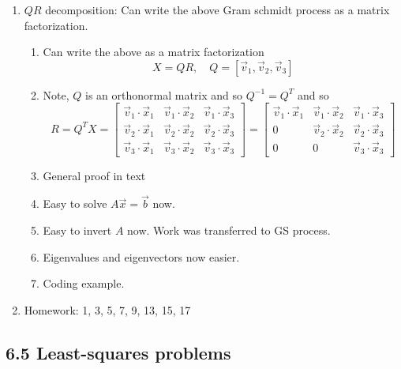 \documentclass{article}
\begin{document}
\begin{enumerate}
\item $QR$ decomposition: Can write the above Gram schmidt process as a matrix factorization.
\begin{enumerate}
\item Can write the above as a matrix factorization
\[
X = Q R, \quad Q = \left[ \vec{v}_1, \vec{v}_2, \vec{v}_3 \right]
\]
\item Note, $Q$ is an orthonormal matrix and so $Q^{-1} = Q^T$ and so
\[
R = Q^T X = \left[
\begin{array}{ccc}
\vec{v}_1 \cdot \vec{x}_1  & \vec{v}_1 \cdot \vec{x}_2  & \vec{v}_1 \cdot \vec{x}_3 \\
\vec{v}_2 \cdot \vec{x}_1  & \vec{v}_2 \cdot \vec{x}_2  & \vec{v}_2 \cdot \vec{x}_3 \\
\vec{v}_3 \cdot \vec{x}_1  & \vec{v}_3 \cdot \vec{x}_2  & \vec{v}_3 \cdot \vec{x}_3  
\end{array}
\right] = 
 \left[
\begin{array}{ccc}
\vec{v}_1 \cdot \vec{x}_1 & \vec{v}_1 \cdot \vec{x}_2  & \vec{v}_1 \cdot \vec{x}_3 \\
0 & \vec{v}_2 \cdot \vec{x}_2  & \vec{v}_2 \cdot \vec{x}_3 \\
0 & 0  & \vec{v}_3 \cdot \vec{x}_3
\end{array}
\right]
\]
\item General proof in text
\item Easy to solve $A \vec{x} = \vec{b}$ now.
\item Easy to invert $A$ now. Work was transferred to GS process.
\item Eigenvalues and eigenvectors now easier.
\item Coding example.
\end{enumerate}


\item Homework: 1, 3, 5, 7, 9, 13, 15, 17

\end{enumerate}

\subsection{6.5 Least-squares problems}
\end{document}
